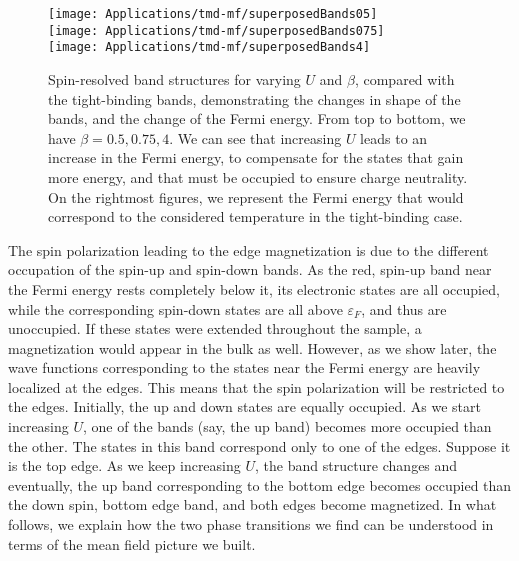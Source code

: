 \begin{figure}[H]
\centering
\texttt{[image: Applications/tmd-mf/superposedBands05]} \\
\texttt{[image: Applications/tmd-mf/superposedBands075]} \\
\texttt{[image: Applications/tmd-mf/superposedBands4]} \\
	\caption[Spin-resolved band structures for varying $U$ and $\beta$, compared with the tight-binding bands.]{Spin-resolved band structures for varying $U$ and $\beta$, compared with the tight-binding bands, demonstrating the changes in shape of the bands, and the change of the Fermi energy.
	From top to bottom, we have $\beta = 0.5, 0.75, 4$.
	We can see that increasing $U$ leads to an increase in the Fermi energy, to compensate for the states that gain more energy, and that must be occupied to ensure charge neutrality.
	On the rightmost figures, we represent the Fermi energy that would correspond to the  considered temperature in the tight-binding case.}
	\label{fig:band-structures}
\end{figure}
The spin polarization leading to the edge magnetization is due to the different occupation of the spin-up and spin-down bands.
As the red, spin-up band near the Fermi energy rests completely below it, its electronic states are all occupied, while the corresponding spin-down states are all above $\varepsilon_F$, and thus are unoccupied.
If these states were extended throughout the sample, a magnetization would appear in the bulk as well.
However, as we show later, the wave functions corresponding to the states near the Fermi energy are heavily localized at the edges.
This means that the spin polarization will be restricted to the edges.
Initially, the up and down states are equally occupied.
As we start increasing $U$, one of the bands (say, the up band) becomes more occupied than the other.
The states in this band correspond only to one of the edges.
Suppose it is the top edge.
As we keep increasing $U$, the band structure changes and eventually, the up band corresponding to the bottom edge becomes occupied than the down spin, bottom edge band, and both edges become magnetized.
In what follows, we explain how the two phase transitions we find can be understood in terms of the mean field picture we built.

